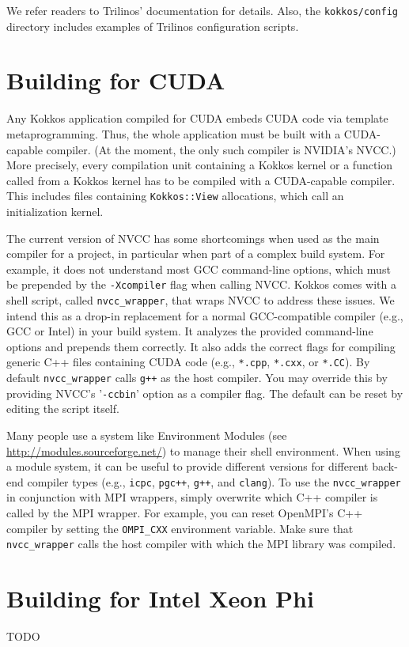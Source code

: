 We refer readers to Trilinos' documentation for details.  Also, the
\texttt{kokkos/config} directory includes examples of Trilinos
configuration scripts.
 
\section{Building for CUDA}\label{S:build:CUDA}

Any Kokkos application compiled for CUDA embeds CUDA code via template metaprogramming.
Thus, the whole application must be built with a CUDA-capable compiler.
(At the moment, the only such compiler is NVIDIA's NVCC.)
More precisely, every compilation unit containing a Kokkos kernel or a function called from a Kokkos kernel has to be compiled with a CUDA-capable compiler. 
This includes files containing \lstinline|Kokkos::View| allocations, which call an initialization kernel. 

The current version of NVCC has some shortcomings when used as the main compiler for a project, in particular when part of a complex build system.
For example, it does not understand most GCC command-line options, which must be prepended by the \lstinline|-Xcompiler| flag when calling NVCC. 
Kokkos comes with a shell script, called \lstinline|nvcc_wrapper|, that wraps NVCC to address these issues.
We intend this as a drop-in replacement for a normal GCC-compatible compiler (e.g., GCC or Intel) in your build system.
It analyzes the provided command-line options and prepends them correctly. 
It also adds the correct flags for compiling generic C++ files containing CUDA code (e.g., \verb!*.cpp!, \verb!*.cxx!, or \verb!*.CC!).
By default \lstinline|nvcc_wrapper| calls \verb!g++! as the host compiler.
You may override this by providing NVCC's '\lstinline|-ccbin|' option as a compiler flag.
The default can be reset by editing the script itself. 

Many people use a system like Environment Modules (see \\ \url{http://modules.sourceforge.net/}) to manage their shell environment.
When using a module system, it can be useful to provide different versions for different back-end compiler types (e.g., \verb!icpc!, \verb!pgc++!, \verb!g++!, and \verb!clang!).
To use the \lstinline|nvcc_wrapper| in conjunction with MPI wrappers, simply overwrite which C++ compiler is called by the MPI wrapper. 
For example, you can reset OpenMPI's C++ compiler by setting the \lstinline|OMPI_CXX| environment variable.
Make sure that \lstinline|nvcc_wrapper| calls the host compiler with which the MPI library was compiled.

\section{Building for Intel Xeon Phi}\label{S:build:Phi}

TODO
